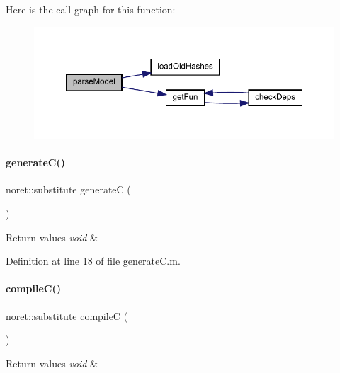 Here is the call graph for this function\+:
\nopagebreak
\begin{figure}[H]
\begin{center}
\leavevmode
\includegraphics[width=350pt]{classamimodel_ae4172c2a8fac8b7c434f03274fcac6ac_cgraph}
\end{center}
\end{figure}
\mbox{\label{classamimodel_a73df9b3d523823e7a0105916471f13f5}} 
\paragraph{\texorpdfstring{generate\+C()}{generateC()}}
{\footnotesize\ttfamily noret\+::substitute generateC (\begin{DoxyParamCaption}{ }\end{DoxyParamCaption})}


\begin{DoxyRetVals}{Return values}
{\em void} & \\
\hline
\end{DoxyRetVals}


Definition at line 18 of file generate\+C.\+m.

\mbox{\label{classamimodel_abf720a0c3104977029538e3b19d429bb}} 
\paragraph{\texorpdfstring{compile\+C()}{compileC()}}
{\footnotesize\ttfamily noret\+::substitute compileC (\begin{DoxyParamCaption}{ }\end{DoxyParamCaption})}


\begin{DoxyRetVals}{Return values}
{\em void} & \\
\hline
\end{DoxyRetVals}


